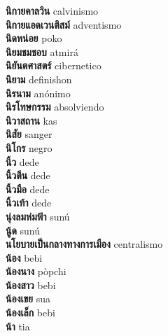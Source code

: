 \textbf{ นิกายคาลวิน  } calvinismo \\
\textbf{ นิกายแอดเวนติสม์  } adventismo \\
\textbf{ นิดหน่อย  } poko \\
\textbf{ นิยมชมชอบ  } atmirá \\
\textbf{ นิยันตศาสตร์  } cibernetico \\
\textbf{ นิยาม  } definishon \\
\textbf{ นิรนาม  } anónimo \\
\textbf{ นิรโทษกรรม  } absolviendo \\
\textbf{ นิวาสถาน  } kas \\
\textbf{ นิสัย  } sanger \\
\textbf{ นิโกร  } negro \\
\textbf{ นิ้ว  } dede \\
\textbf{ นิ้วตีน  } dede \\
\textbf{ นิ้วมือ  } dede \\
\textbf{ นิ้วเท้า  } dede \\
\textbf{ นุ่งลมห่มฟ้า  } sunú \\
\textbf{ นู้ด  } sunú \\
\textbf{ นโยบายเป็นกลางทางการเมือง  } centralismo \\
\textbf{ น้อง  } bebi \\
\textbf{ น้องนาง  } pòpchi \\
\textbf{ น้องสาว  } bebi \\
\textbf{ น้องเขย  } sua \\
\textbf{ น้องเล็ก  } bebi \\
\textbf{ น้า  } tia \\

